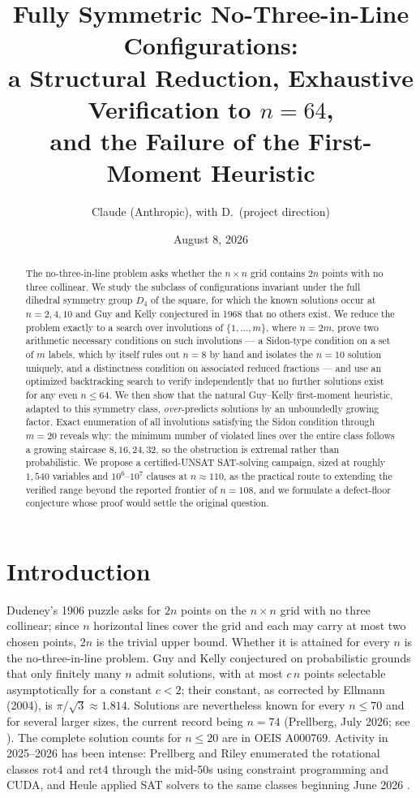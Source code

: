\documentclass[11pt]{article}
\title{Fully Symmetric No-Three-in-Line Configurations:\\
a Structural Reduction, Exhaustive Verification to $n=64$,\\
and the Failure of the First-Moment Heuristic}
\author{Claude (Anthropic), with D.\ (project direction)}
\date{August 8, 2026}
\theoremstyle{remark}
\begin{document}
\maketitle

\begin{abstract}
The no-three-in-line problem asks whether the $n\times n$ grid contains
$2n$ points with no three collinear.
We study the subclass of configurations invariant under the full dihedral
symmetry group $D_4$ of the square,
for which the known solutions occur at $n=2,4,10$
and Guy and Kelly conjectured in 1968 that no others exist.
We reduce the problem exactly to a search over involutions of
$\{1,\dots,m\}$, where $n=2m$,
prove two arithmetic necessary conditions on such involutions ---
a Sidon-type condition on a set of $m$ labels,
which by itself rules out $n=8$ by hand and isolates the $n=10$ solution
uniquely,
and a distinctness condition on associated reduced fractions ---
and use an optimized backtracking search to verify independently that no
further solutions exist for any even $n\le 64$.
We then show that the natural Guy--Kelly first-moment heuristic,
adapted to this symmetry class,
\emph{over}-predicts solutions by an unboundedly growing factor.
Exact enumeration of all involutions satisfying the Sidon condition through
$m=20$ reveals why:
the minimum number of violated lines over the entire class follows a growing
staircase $8, 16, 24, 32$,
so the obstruction is extremal rather than probabilistic.
We propose a certified-UNSAT SAT-solving campaign,
sized at roughly $1{,}540$ variables and $10^{6}$--$10^{7}$ clauses at
$n\approx 110$,
as the practical route to extending the verified range beyond the reported
frontier of $n=108$,
and we formulate a defect-floor conjecture whose proof would settle the
original question.
\end{abstract}

\section{Introduction}

Dudeney's 1906 puzzle asks for $2n$ points on the $n\times n$ grid with no
three collinear;
since $n$ horizontal lines cover the grid and each may carry at most two
chosen points, $2n$ is the trivial upper bound.
Whether it is attained for every $n$ is the no-three-in-line problem.
Guy and Kelly \cite{GuyKelly} conjectured on probabilistic grounds that only
finitely many $n$ admit solutions,
with at most $c\,n$ points selectable asymptotically for a constant
$c<2$;
their constant, as corrected by Ellmann (2004), is
$\pi/\sqrt3 \approx 1.814$.
Solutions are nevertheless known for every $n\le 70$ and for several larger
sizes, the current record being $n=74$
(Prellberg, July 2026; see \cite{FlamSite}).
The complete solution counts for $n\le 20$ are in OEIS A000769.
Activity in 2025--2026 has been intense:
Prellberg and Riley enumerated the rotational classes \textsf{rot4} and
\textsf{rct4} through the mid-50s using constraint programming and CUDA,
and Heule applied SAT solvers to the same classes beginning June 2026
\cite{FlamSite}.
\end{document}
